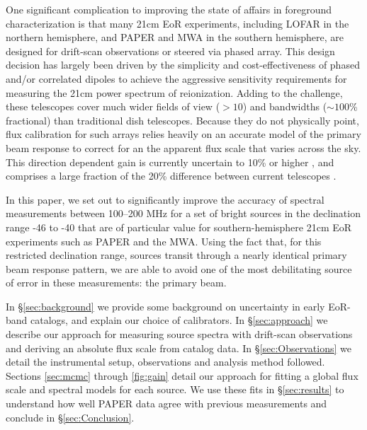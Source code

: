 \documentclass[preprint]{aastex}
\begin{document}
One significant complication to improving the state of affairs in foreground characterization
is that many 21cm EoR experiments, including LOFAR in the northern hemisphere, and
PAPER and MWA in the southern hemisphere, are designed for drift-scan observations or steered via phased array.
This design decision has largely been driven by the simplicity and cost-effectiveness of
phased and/or correlated dipoles to achieve the aggressive sensitivity requirements
for measuring the 21cm power spectrum of reionization.
Adding to the challenge, these telescopes 
cover much wider fields of view ($>10$\arcdeg) and bandwidths
($\sim 100$\% fractional) than traditional dish telescopes.
Because they do not physically point, flux calibration for such arrays relies heavily
on an accurate model of the primary beam response to correct for an
the apparent flux scale that varies across the sky.
This direction dependent gain is currently uncertain to 10\% or higher
\citep{Pober:2012p8800}, and comprises a large fraction of the 20\% difference between current telescopes \citep{Jacobs:2013p9908}.

In this paper, we set out to significantly improve the accuracy of spectral measurements between 
100--200 MHz for a set of bright sources in the declination range -46\arcdeg{} to -40\arcdeg{} that
are of particular value for southern-hemisphere 21cm EoR experiments such as PAPER and the MWA.
Using the fact that, for this restricted declination range,
sources transit through a nearly identical primary beam response pattern, we are able to avoid one of the
most debilitating source of error in these measurements: the primary beam.  


In \S\ref{sec:background} we provide some background on uncertainty in early EoR-band catalogs,
and explain our choice of calibrators.
In \S\ref{sec:approach} we describe our approach for measuring source spectra with
drift-scan observations and deriving an absolute flux scale from catalog data.  
In \S\ref{sec:Observations} we detail the instrumental 
setup, observations and analysis method followed. Sections \ref{sec:mcmc} through
\ref{fig:gain} detail our approach for fitting a global flux scale and spectral models for each source.
We use these fits in \S\ref{sec:results} to understand how well PAPER data agree
with previous measurements and conclude in \S\ref{sec:Conclusion}.
\end{document}
